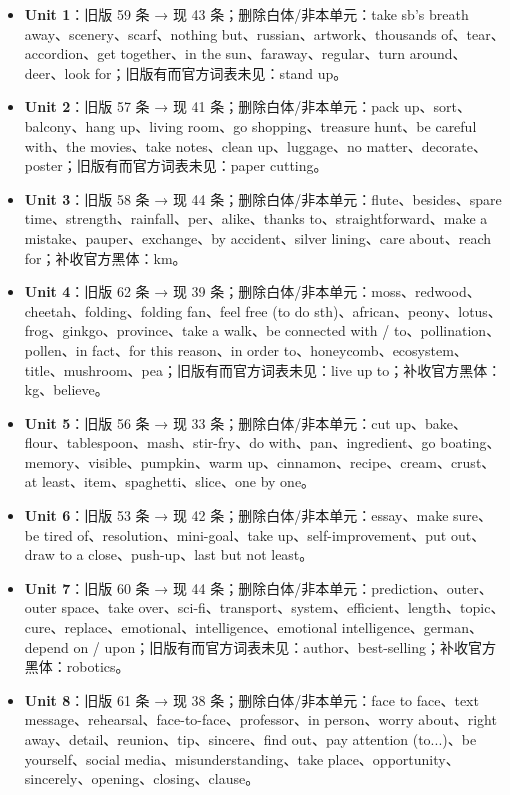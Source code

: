 \documentclass[UTF8,a4paper,11pt,oneside]{ctexbook}
\begin{document}
\begin{itemize}[leftmargin=2.2em,itemsep=0.25ex,topsep=0.3ex,label={\textcolor{mainblue}{\small\textbullet}}]
\item \textbf{\textcolor{mainblue}{Unit 1}}：旧版 59 条 → 现 43 条；删除白体/非本单元：take sb's breath away、scenery、scarf、nothing but、russian、artwork、thousands of、tear、accordion、get together、in the sun、faraway、regular、turn around、deer、look for；旧版有而官方词表未见：stand up。
\item \textbf{\textcolor{mainblue}{Unit 2}}：旧版 57 条 → 现 41 条；删除白体/非本单元：pack up、sort、balcony、hang up、living room、go shopping、treasure hunt、be careful with、the movies、take notes、clean up、luggage、no matter、decorate、poster；旧版有而官方词表未见：paper cutting。
\item \textbf{\textcolor{mainblue}{Unit 3}}：旧版 58 条 → 现 44 条；删除白体/非本单元：flute、besides、spare time、strength、rainfall、per、alike、thanks to、straightforward、make a mistake、pauper、exchange、by accident、silver lining、care about、reach for；补收官方黑体：km。
\item \textbf{\textcolor{mainblue}{Unit 4}}：旧版 62 条 → 现 39 条；删除白体/非本单元：moss、redwood、cheetah、folding、folding fan、feel free (to do sth)、african、peony、lotus、frog、ginkgo、province、take a walk、be connected with / to、pollination、pollen、in fact、for this reason、in order to、honeycomb、ecosystem、title、mushroom、pea；旧版有而官方词表未见：live up to；补收官方黑体：kg、believe。
\item \textbf{\textcolor{mainblue}{Unit 5}}：旧版 56 条 → 现 33 条；删除白体/非本单元：cut up、bake、flour、tablespoon、mash、stir-fry、do with、pan、ingredient、go boating、memory、visible、pumpkin、warm up、cinnamon、recipe、cream、crust、at least、item、spaghetti、slice、one by one。
\item \textbf{\textcolor{mainblue}{Unit 6}}：旧版 53 条 → 现 42 条；删除白体/非本单元：essay、make sure、be tired of、resolution、mini-goal、take up、self-improvement、put out、draw to a close、push-up、last but not least。
\item \textbf{\textcolor{mainblue}{Unit 7}}：旧版 60 条 → 现 44 条；删除白体/非本单元：prediction、outer、outer space、take over、sci-fi、transport、system、efficient、length、topic、cure、replace、emotional、intelligence、emotional intelligence、german、depend on / upon；旧版有而官方词表未见：author、best-selling；补收官方黑体：robotics。
\item \textbf{\textcolor{mainblue}{Unit 8}}：旧版 61 条 → 现 38 条；删除白体/非本单元：face to face、text message、rehearsal、face-to-face、professor、in person、worry about、right away、detail、reunion、tip、sincere、find out、pay attention (to...)、be yourself、social media、misunderstanding、take place、opportunity、sincerely、opening、closing、clause。
\end{itemize}
\end{document}
